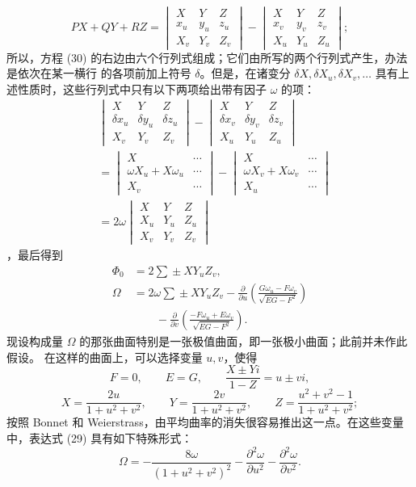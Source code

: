 \documentclass[11pt,a4paper,leqno]{article}
\begin{document}
\[
PX+QY+RZ=
\begin{vmatrix}X&Y&Z\\x_u&y_u&z_u\\X_v&Y_v&Z_v\end{vmatrix}
-\begin{vmatrix}X&Y&Z\\x_v&y_v&z_v\\X_u&Y_u&Z_u\end{vmatrix};
\]
所以，方程 (30) 的右边由六个行列式组成；它们由所写的两个行列式产生，办法是依次在某一横行
的各项前加上符号 $\delta$。但是，在诸变分 $\delta X,\delta X_u,\delta X_v,\ldots$
具有上述性质时，这些行列式中只有以下两项给出带有因子 $\omega$ 的项：
\[
\begin{aligned}
&\begin{vmatrix}X&Y&Z\\
\delta x_u&\delta y_u&\delta z_u\\X_v&Y_v&Z_v\end{vmatrix}
-\begin{vmatrix}X&Y&Z\\
\delta x_v&\delta y_v&\delta z_v\\X_u&Y_u&Z_u\end{vmatrix}\\
&=\begin{vmatrix}X&\cdots\\
\omega X_u+X\omega_u&\cdots\\X_v&\cdots\end{vmatrix}
-\begin{vmatrix}X&\cdots\\
\omega X_v+X\omega_v&\cdots\\X_u&\cdots\end{vmatrix}\\
&=2\omega\begin{vmatrix}X&Y&Z\\X_u&Y_u&Z_u\\X_v&Y_v&Z_v\end{vmatrix}
\end{aligned}
\]
，最后得到
\[
\begin{aligned}
\Phi_0&=2\sum\!\pm XY_uZ_v,\\
\Omega&=2\omega\sum\!\pm XY_uZ_v
-\frac{\partial}{\partial u}\left(
\frac{G\omega_u-F\omega_v}{\sqrt{EG-F^2}}\right)\\
&\qquad-\frac{\partial}{\partial v}\left(
\frac{-F\omega_u+E\omega_v}{\sqrt{EG-F^2}}\right).
\end{aligned}
\]
现设构成量 $\Omega$ 的那张曲面特别是一张极值曲面，即一张极小曲面；此前并未作此假设。
在这样的曲面上，可以选择变量 $u,v$，使得
\[
F=0,\qquad E=G,\qquad \frac{X\pm Yi}{1-Z}=u\pm vi,
\]
\[
X=\frac{2u}{1+u^2+v^2},\qquad
Y=\frac{2v}{1+u^2+v^2},\qquad
Z=\frac{u^2+v^2-1}{1+u^2+v^2};
\]
按照 Bonnet 和 Weierstrass，由平均曲率的消失很容易推出这一点。在这些变量中，表达式 (29)
具有如下特殊形式：
\[
\Omega=-\frac{8\omega}{(1+u^2+v^2)^2}
-\frac{\partial^2\omega}{\partial u^2}
-\frac{\partial^2\omega}{\partial v^2}.
\]
\end{document}
